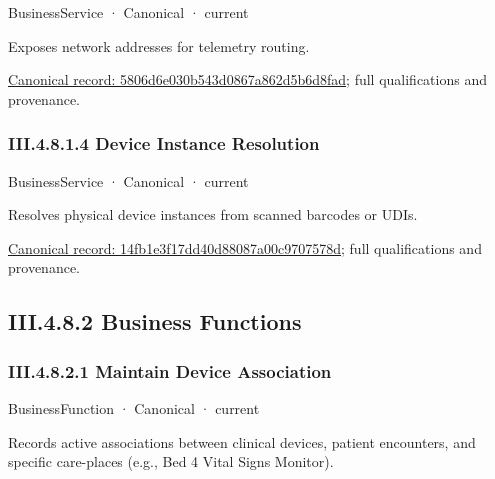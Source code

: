 \label{element:5806d6e030b543d0867a862d5b6d8fad}
{\small BusinessService · Canonical · current}\par

Exposes network addresses for telemetry routing.


{\footnotesize \href{../../../../continuum/business/business-service/5806d6e030b543d0867a862d5b6d8fad.md}{Canonical record: 5806d6e030b543d0867a862d5b6d8fad}; full qualifications and provenance.}\par
\subsubsection*{III.4.8.1.4 Device Instance Resolution}
\label{navigation:III.4.8.1.4}

\label{element:14fb1e3f17dd40d88087a00c9707578d}
{\small BusinessService · Canonical · current}\par

Resolves physical device instances from scanned barcodes or UDIs.


{\footnotesize \href{../../../../continuum/business/business-service/14fb1e3f17dd40d88087a00c9707578d.md}{Canonical record: 14fb1e3f17dd40d88087a00c9707578d}; full qualifications and provenance.}\par
\subsection*{III.4.8.2 Business Functions}
\label{navigation:III.4.8.2}

\subsubsection*{III.4.8.2.1 Maintain Device Association}
\label{navigation:III.4.8.2.1}

\label{element:fc0f4d9c781241359d783d26f038b7ff}
{\small BusinessFunction · Canonical · current}\par

Records active associations between clinical devices, patient encounters, and specific care-places (e.g., Bed 4 Vital Signs Monitor).


